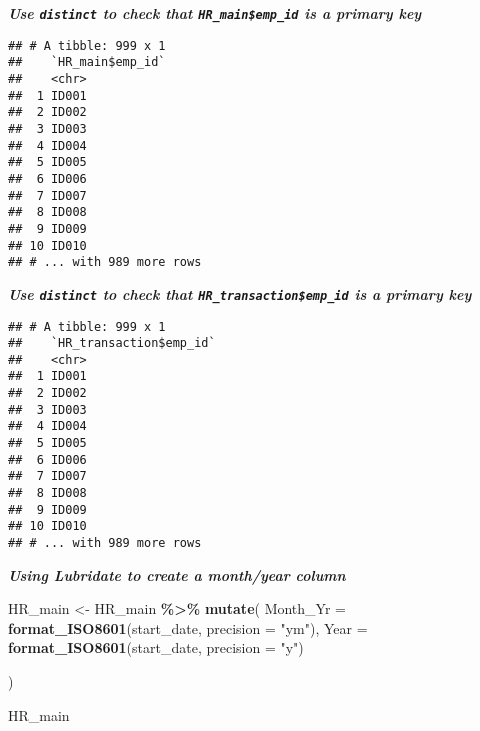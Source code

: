 \documentclass[
]{article}
\newenvironment{Shaded}{\begin{snugshade}}{\end{snugshade}}
\newcommand{\DataTypeTok}[1]{\textcolor[rgb]{0.13,0.29,0.53}{#1}}
\newcommand{\KeywordTok}[1]{\textcolor[rgb]{0.13,0.29,0.53}{\textbf{#1}}}
\newcommand{\NormalTok}[1]{#1}
\newcommand{\OperatorTok}[1]{\textcolor[rgb]{0.81,0.36,0.00}{\textbf{#1}}}
\newcommand{\StringTok}[1]{\textcolor[rgb]{0.31,0.60,0.02}{#1}}
\begin{document}
\textbf{\emph{Use \texttt{distinct} to check that
\texttt{HR\_main\$emp\_id} is a primary key}}

\begin{Shaded}
\end{Shaded}

\begin{verbatim}
## # A tibble: 999 x 1
##    `HR_main$emp_id`
##    <chr>           
##  1 ID001           
##  2 ID002           
##  3 ID003           
##  4 ID004           
##  5 ID005           
##  6 ID006           
##  7 ID007           
##  8 ID008           
##  9 ID009           
## 10 ID010           
## # ... with 989 more rows
\end{verbatim}

\textbf{\emph{Use \texttt{distinct} to check that
\texttt{HR\_transaction\$emp\_id} is a primary key}}

\begin{Shaded}
\end{Shaded}

\begin{verbatim}
## # A tibble: 999 x 1
##    `HR_transaction$emp_id`
##    <chr>                  
##  1 ID001                  
##  2 ID002                  
##  3 ID003                  
##  4 ID004                  
##  5 ID005                  
##  6 ID006                  
##  7 ID007                  
##  8 ID008                  
##  9 ID009                  
## 10 ID010                  
## # ... with 989 more rows
\end{verbatim}

\textbf{\emph{Using Lubridate to create a month/year column}}

\begin{Shaded}
\begin{Highlighting}[]
\NormalTok{HR\_main \textless{}{-}}\StringTok{ }\NormalTok{HR\_main }\OperatorTok{\%\textgreater{}\%}
\StringTok{  }\KeywordTok{mutate}\NormalTok{(}
    \DataTypeTok{Month\_Yr =} \KeywordTok{format\_ISO8601}\NormalTok{(start\_date, }\DataTypeTok{precision =} \StringTok{"ym"}\NormalTok{),}
    \DataTypeTok{Year =} \KeywordTok{format\_ISO8601}\NormalTok{(start\_date, }\DataTypeTok{precision =} \StringTok{"y"}\NormalTok{)}
    
\NormalTok{  )}

\NormalTok{HR\_main}
\end{Highlighting}
\end{Shaded}
\end{document}
